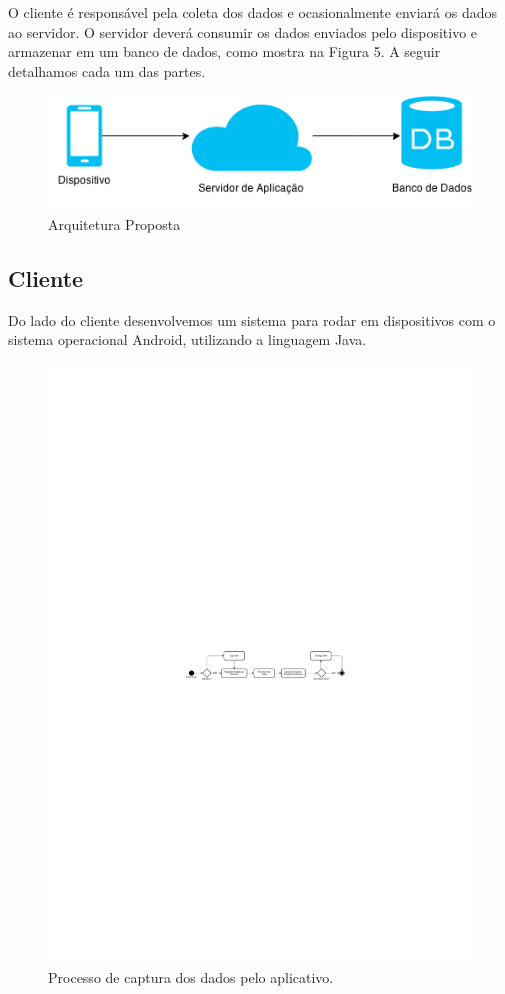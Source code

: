 \documentclass[12pt, %
openright, 
oneside,
a4paper,
brazil]{facom-ufu-abntex2}
\begin{document}
 O cliente é responsável pela coleta dos dados e ocasionalmente enviará os dados ao servidor. O servidor deverá consumir os dados enviados pelo dispositivo  e armazenar em um banco de dados, como mostra na Figura 5.  A seguir detalhamos cada um das partes.

\begin{figure}[hbt]
  \includegraphics{arquiteturaProposta}
  \caption{Arquitetura Proposta}
\end{figure}


\subsection{Cliente}
Do lado do cliente desenvolvemos um sistema para rodar em dispositivos com o sistema operacional Android, utilizando a linguagem Java.

\begin{figure}[hbt]
  \includegraphics [scale=.4] {pherocast1}
  \caption{Processo de captura dos dados pelo aplicativo.}
\end{figure}
\end{document}
